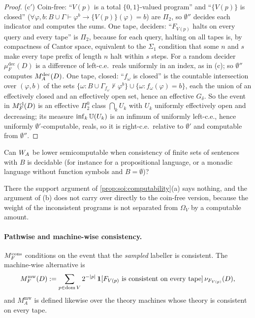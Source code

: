 \begin{proof}
(c$'$) Coin-free: ``$V(p)$ is a total $\{0,1\}$-valued program'' and ``$\{V(p)\}$ is closed'' ($\forall\varphi,b:B\cup\Gamma\vdash\varphi^b\to\{V(p)\}(\varphi)=b$) are $\Pi_2$, so $\emptyset''$ decides each indicator and computes the sums. One tape, deciders: ``$F_{V(p)}$ halts on every query and every tape'' is $\Pi_2$, because for each query, halting on all tapes is, by compactness of Cantor space, equivalent to the $\Sigma_1$ condition that some $n$ and $s$ make every tape prefix of length $n$ halt within $s$ steps. For a random decider $\mu^{\mathrm{dec}}_F(D)$ is a difference of left-c.e.\ reals uniformly in an index, as in (c); so $\emptyset''$ computes $M_{A}^{\mathrm{dec}}(D)$. One tape, closed: ``$f_\omega$ is closed'' is the countable intersection over $(\varphi,b)$ of the sets $\{\omega:B\cup\Gamma_{f_\omega}\nvdash\varphi^b\}\cup\{\omega:f_\omega(\varphi)=b\}$, each the union of an effectively closed and an effectively open set, hence an effective $G_\delta$. So the event in $M_{F}^{\mathrm{cl}}(D)$ is an effective $\Pi^0_2$ class $\bigcap_kU_k$ with $U_k$ uniformly effectively open and decreasing; its measure $\inf_k\mathbb{U}(U_k)$ is an infimum of uniformly left-c.e., hence uniformly $\emptyset'$-computable, reals, so it is right-c.e.\ relative to $\emptyset'$ and computable from $\emptyset''$.
\end{proof}

\begin{question}\label{q:soi:lsc}
Can $W_{A}$ be lower semicomputable when consistency of finite sets of sentences with $B$ is decidable (for instance for a propositional language, or a monadic language without function symbols and $B=\emptyset$)?
\end{question}

There the support argument of \cref{prop:soi:computability}(a) says nothing, and the argument of (b) does not carry over directly to the coin-free version, because the weight of the inconsistent programs is not separated from $\Omega_V$ by a computable amount.

\paragraph{Pathwise and machine-wise consistency.} $M_{F}^{\mathrm{cons}}$ conditions on the event that the \emph{sampled} labeller is consistent. The machine-wise alternative is
\[
M_{F}^{\mathrm{mw}}(D):=\sum_{p\in\operatorname{dom} V}2^{-\lvert p\rvert}\,\mathbf{1}[F_{V(p)}\text{ is consistent on every tape}]\,\nu_{F_{V(p)}}(D),
\]
and $M_A^{\mathrm{mw}}$ is defined likewise over the theory machines whose theory is consistent on every tape.

